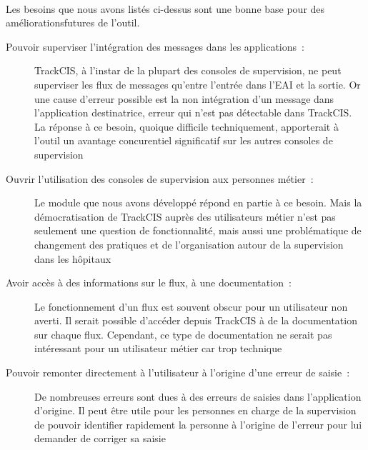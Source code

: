			\paragraph{}%
			Les besoins que nous avons listés ci-dessus sont une bonne base pour des
			améliorationsfutures de l'outil.
			\begin{description}
				\item[Pouvoir superviser l'intégration des messages dans les applications~:]
				TrackCIS, à l'instar de la plupart des consoles de supervision, ne peut
				superviser les flux de messages qu'entre l'entrée dans l'EAI et la sortie.
				Or une cause d'erreur possible est la non intégration d'un message dans
				l'application destinatrice, erreur qui n'est pas détectable dans TrackCIS.
				La réponse à ce besoin, quoique difficile techniquement, apporterait à
				l'outil un avantage concurentiel significatif sur les autres consoles de
				supervision
				\item[Ouvrir l'utilisation des consoles de supervision aux personnes
				métier~:] Le module que nous avons développé répond en partie à ce besoin.
				Mais la démocratisation de TrackCIS auprès des utilisateurs métier n'est
				pas seulement une question de fonctionnalité, mais aussi une problématique de
				changement des pratiques et de l'organisation autour de la supervision dans
				les hôpitaux
				\item[Avoir accès à des informations sur le flux, à une documentation~:] Le
				fonctionnement d'un flux est souvent obscur pour un utilisateur non averti.
				Il serait possible d'accéder depuis TrackCIS à de la documentation sur
				chaque flux. Cependant, ce type de documentation ne serait pas intéressant
				pour un utilisateur métier car trop technique
				\item[Pouvoir remonter directement à l'utilisateur à l'origine d'une erreur
			  	de saisie~:] De nombreuses erreurs sont dues à des erreurs de saisies
			  	dans l'application d'origine. Il peut être utile pour les personnes en
			  	charge de la supervision de pouvoir identifier rapidement la personne à
			  	l'origine de l'erreur pour lui demander de corriger sa saisie
			\end{description}
			

